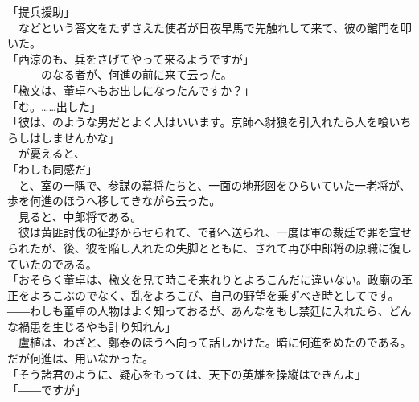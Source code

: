\documentclass[
  paper=a5,
  fontsize=10pt,
  jafontsize=9.5pt,
  tate,                  %
  open_bracket_pos=nibu, %
]{jlreq}
\begin{document}
「提兵援助」\\


　などという答文をたずさえた使者が日夜早馬で先触れして来て、彼の館門を叩いた。\\


「西涼のも、兵をさげてやって来るようですが」\\


　――のなる者が、何進の前に来て云った。\\


「檄文は、董卓へもお出しになったんですか？」\\


「む。……出した」\\


「彼は、のような男だとよく人はいいます。京師へ豺狼を引入れたら人を喰いちらしはしませんかな」\\


　が憂えると、\\


「わしも同感だ」\\


　と、室の一隅で、参謀の幕将たちと、一面の地形図をひらいていた一老将が、歩を何進のほうへ移してきながら云った。\\


　見ると、中郎将である。\\


　彼は黄匪討伐の征野からせられて、で都へ送られ、一度は軍の裁廷で罪を宣せられたが、後、彼を陥し入れたの失脚とともに、されて再び中郎将の原職に復していたのである。\\


「おそらく董卓は、檄文を見て時こそ来れりとよろこんだに違いない。政廟の革正をよろこぶのでなく、乱をよろこび、自己の野望を乗ずべき時としてです。――わしも董卓の人物はよく知っておるが、あんなをもし禁廷に入れたら、どんな禍患を生じるやも計り知れん」\\


　盧植は、わざと、鄭泰のほうへ向って話しかけた。暗に何進をめたのである。だが何進は、用いなかった。\\


「そう諸君のように、疑心をもっては、天下の英雄を操縦はできんよ」\\


「――ですが」\\
\end{document}
